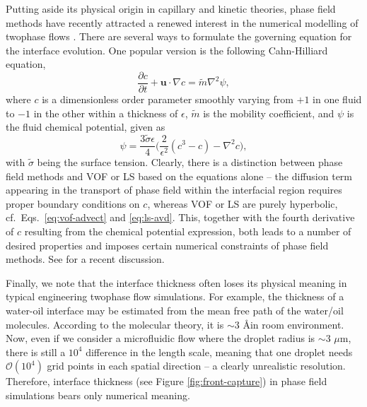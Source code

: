 Putting aside its physical origin in capillary and kinetic theories, phase field methods have recently attracted a renewed interest in the numerical modelling of twophase flows \citep{jacqmin_1999a, Jacqmin2000, Badalassi_etal_2003, Ding_Spelt_Shu2007, Shen_Yang_2010, dong_shen_2012a, Wang_Shu_Shao_Wu_Niu_2015, Martin, Mirjalili_Ivey_Mani_2020}.
There are several ways to formulate the governing equation for the interface evolution. One popular version is the following Cahn-Hilliard equation,
\begin{equation} \label{eq:C-H}
  \frac{\partial c}{\partial t} + {\bm u}\cdot \nabla c =\tilde{m}\nabla ^2 \psi,
\end{equation}
where $c$ is a dimensionless order parameter smoothly varying from $+1$ in one fluid to $-1$ in the other within a thickness of $\epsilon$,
$\tilde{m}$ is the mobility coefficient,
and $\psi$ is the fluid chemical potential, given as
\begin{equation} \label{eq:ch-chem}
  \psi = \frac{3\tilde{\sigma} \epsilon}{4} 
  \bigg(\frac{2}{\epsilon^2}(c^3-c) -\nabla ^2 c \bigg),
\end{equation}
with $\tilde{\sigma}$ being the surface tension.
Clearly, there is a distinction between phase field methods and VOF or LS based on the equations alone --
the diffusion term appearing in the transport of phase field within the interfacial region requires proper boundary conditions on $c$, whereas VOF or LS are purely hyperbolic, cf.\ Eqs.\ \eqref{eq:vof-advect} and \eqref{eq:ls-avd}.
This, together with the fourth derivative of $c$ resulting from the chemical potential expression, both leads to a number of desired properties and imposes certain numerical constraints of phase field methods.
See \cite{Mirjalili_Ivey_Mani_2020} for a recent discussion.

Finally, we note that the interface thickness often loses its physical meaning in typical engineering twophase flow simulations. 
For example, the thickness of a water-oil interface may be estimated from the mean free path of the water/oil molecules. According to the molecular theory, it is $\sim 3$ \AA \enspace in room environment. Now, even if we consider a microfluidic flow where the droplet radius is $\sim 3$ $\mu$m, there is still a $10^{4}$ difference in the length scale, meaning that one droplet needs $\mathcal{O}(10^{4})$ grid points in each spatial direction -- a clearly unrealistic resolution.
Therefore, interface thickness (see Figure \ref{fig:front-capture}) in phase field simulations bears only numerical meaning.


